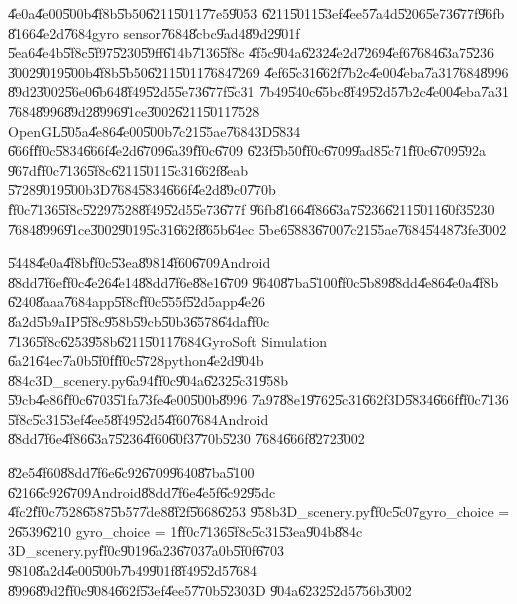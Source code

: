 \U{4e0a}\U{4e00}\U{500b}\U{4f8b}\U{5b50}\U{6211}\U{5011}\U{77e5}\U{9053}%
\U{6211}\U{5011}\U{53ef}\U{4ee5}\U{7a4d}\U{5206}\U{5e73}\U{677f}\U{96fb}%
\U{8166}\U{4e2d}\U{7684}gyro sensor\U{7684}\U{8cbc}\U{9ad4}\U{89d2}\U{901f}%
\U{5ea6}\U{4e4b}\U{5f8c}\U{5f97}\U{5230}\U{59ff}\U{614b}\U{7136}\U{5f8c}%
\U{4f5c}\U{904a}\U{6232}\U{4e2d}\U{7269}\U{4ef6}\U{7684}\U{63a7}\U{5236}%
\U{3002}\U{9019}\U{500b}\U{4f8b}\U{5b50}\U{6211}\U{5011}\U{7684}\U{7269}%
\U{4ef6}\U{5c31}\U{662f}\U{7b2c}\U{4e00}\U{4eba}\U{7a31}\U{7684}\U{8996}%
\U{89d2}\U{3002}\U{56e0}\U{6b64}\U{8f49}\U{52d5}\U{5e73}\U{677f}\U{5c31}%
\U{7b49}\U{540c}\U{65bc}\U{8f49}\U{52d5}\U{7b2c}\U{4e00}\U{4eba}\U{7a31}%
\U{7684}\U{8996}\U{89d2}\U{8996}\U{91ce}\U{3002}\U{6211}\U{5011}\U{7528}%
OpenGL\U{505a}\U{4e86}\U{4e00}\U{500b}\U{7c21}\U{55ae}\U{7684}3D\U{5834}%
\U{666f}\U{ff0c}\U{5834}\U{666f}\U{4e2d}\U{6709}\U{6a39}\U{ff0c}\U{6709}%
\U{623f}\U{5b50}\U{ff0c}\U{6709}\U{9ad8}\U{5c71}\U{ff0c}\U{6709}\U{592a}%
\U{967d}\U{ff0c}\U{7136}\U{5f8c}\U{6211}\U{5011}\U{5c31}\U{662f}\U{8eab}%
\U{5728}\U{9019}\U{500b}3D\U{7684}\U{5834}\U{666f}\U{4e2d}\U{89c0}\U{770b}%
\U{ff0c}\U{7136}\U{5f8c}\U{5229}\U{7528}\U{8f49}\U{52d5}\U{5e73}\U{677f}%
\U{96fb}\U{8166}\U{4f86}\U{63a7}\U{5236}\U{6211}\U{5011}\U{60f3}\U{5230}%
\U{7684}\U{8996}\U{91ce}\U{3002}\U{9019}\U{5c31}\U{662f}\U{865b}\U{64ec}%
\U{5be6}\U{5883}\U{6700}\U{7c21}\U{55ae}\U{7684}\U{5448}\U{73fe}\U{3002}

\U{5448}\U{4e0a}\U{4f8b}\U{ff0c}\U{53ea}\U{8981}\U{4f60}\U{6709}Android%
\U{88dd}\U{7f6e}\U{ff0c}\U{4e26}\U{4e14}\U{88dd}\U{7f6e}\U{88e1}\U{6709}%
\U{9640}\U{87ba}\U{5100}\U{ff0c}\U{5b89}\U{88dd}\U{4e86}\U{4e0a}\U{4f8b}%
\U{6240}\U{8aaa}\U{7684}app\U{5f8c}\U{ff0c}\U{555f}\U{52d5}app\U{4e26}%
\U{8a2d}\U{5b9a}IP\U{5f8c}\U{958b}\U{59cb}\U{50b3}\U{6578}\U{64da}\U{ff0c}%
\U{7136}\U{5f8c}\U{6253}\U{958b}\U{6211}\U{5011}\U{7684}GyroSoft Simulation%
\U{6a21}\U{64ec}\U{7a0b}\U{5f0f}\U{ff0c}\U{5728}python\U{4e2d}\U{904b}%
\U{884c}3D\_scenery.py\U{6a94}\U{ff0c}\U{904a}\U{6232}\U{5c31}\U{958b}%
\U{59cb}\U{4e86}\U{ff0c}\U{6703}\U{51fa}\U{73fe}\U{4e00}\U{500b}\U{8996}%
\U{7a97}\U{88e1}\U{9762}\U{5c31}\U{662f}3D\U{5834}\U{666f}\U{ff0c}\U{7136}%
\U{5f8c}\U{5c31}\U{53ef}\U{4ee5}\U{8f49}\U{52d5}\U{4f60}\U{7684}Android%
\U{88dd}\U{7f6e}\U{4f86}\U{63a7}\U{5236}\U{4f60}\U{60f3}\U{770b}\U{5230}%
\U{7684}\U{666f}\U{8272}\U{3002}

\U{82e5}\U{4f60}\U{88dd}\U{7f6e}\U{6c92}\U{6709}\U{9640}\U{87ba}\U{5100}%
\U{6216}\U{6c92}\U{6709}Android\U{88dd}\U{7f6e}\U{4e5f}\U{6c92}\U{95dc}%
\U{4fc2}\U{ff0c}\U{7528}\U{6587}\U{5b57}\U{7de8}\U{8f2f}\U{5668}\U{6253}%
\U{958b}3D\_scenery.py\U{ff0c}\U{5c07}gyro\_choice = 2\U{6539}\U{6210}%
gyro\_choice = 1\U{ff0c}\U{7136}\U{5f8c}\U{5c31}\U{53ea}\U{904b}\U{884c}%
3D\_scenery.py\U{ff0c}\U{9019}\U{6a23}\U{6703}\U{7a0b}\U{5f0f}\U{6703}%
\U{9810}\U{8a2d}\U{4e00}\U{500b}\U{7b49}\U{901f}\U{8f49}\U{52d5}\U{7684}%
\U{8996}\U{89d2}\U{ff0c}\U{9084}\U{662f}\U{53ef}\U{4ee5}\U{770b}\U{5230}3D%
\U{904a}\U{6232}\U{52d5}\U{756b}\U{3002}

